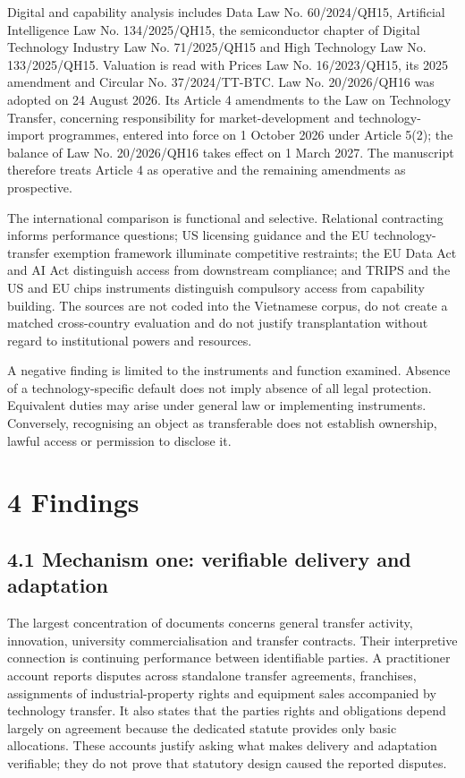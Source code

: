 \documentclass[
]{article}
\begin{document}
Digital and capability analysis includes Data Law No. 60/2024/QH15,
Artificial Intelligence Law No. 134/2025/QH15, the semiconductor chapter
of Digital Technology Industry Law No. 71/2025/QH15 and High Technology
Law No. 133/2025/QH15. Valuation is read with Prices Law No.
16/2023/QH15, its 2025 amendment and Circular No. 37/2024/TT-BTC. Law
No. 20/2026/QH16 was adopted on 24 August 2026. Its Article 4 amendments
to the Law on Technology Transfer, concerning responsibility for
market-development and technology-import programmes, entered into force
on 1 October 2026 under Article 5(2); the balance of Law No.
20/2026/QH16 takes effect on 1 March 2027. The manuscript therefore
treats Article 4 as operative and the remaining amendments as
prospective.

The international comparison is functional and selective. Relational
contracting informs performance questions; US licensing guidance and the
EU technology-transfer exemption framework illuminate competitive
restraints; the EU Data Act and AI Act distinguish access from
downstream compliance; and TRIPS and the US and EU chips instruments
distinguish compulsory access from capability building. The sources are
not coded into the Vietnamese corpus, do not create a matched
cross-country evaluation and do not justify transplantation without
regard to institutional powers and resources.

A negative finding is limited to the instruments and function examined.
Absence of a technology-specific default does not imply absence of all
legal protection. Equivalent duties may arise under general law or
implementing instruments. Conversely, recognising an object as
transferable does not establish ownership, lawful access or permission
to disclose it.

\section{4 Findings}\label{findings}

\subsection{4.1 Mechanism one: verifiable delivery and
adaptation}\label{mechanism-one-verifiable-delivery-and-adaptation}

The largest concentration of documents concerns general transfer
activity, innovation, university commercialisation and transfer
contracts. Their interpretive connection is continuing performance
between identifiable parties. A practitioner account reports disputes
across standalone transfer agreements, franchises, assignments of
industrial-property rights and equipment sales accompanied by technology
transfer. It also states that the parties\textquotesingle{} rights and
obligations depend largely on agreement because the dedicated statute
provides only basic allocations. These accounts justify asking what
makes delivery and adaptation verifiable; they do not prove that
statutory design caused the reported disputes.
\end{document}
